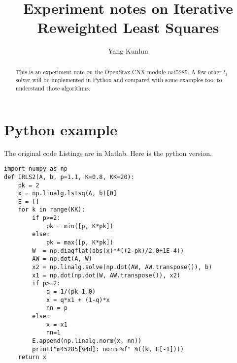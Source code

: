 \documentclass[12pt]{article}
\begin{document}
\title{Experiment notes on Iterative Reweighted Least Squares}
\author{Yang Kunlun}
\maketitle
\begin{abstract}
    This is an experiment note on the OpenStax-CNX module $m45285$.
    A few other $l_1$ solver will be implemented in Python and compared 
    with some examples too, to understand those algorithms.
\end{abstract}

\section{Python example}
The original code Listings are in Matlab. Here is the python version.
\begin{lstlisting}[style=myPy]
import numpy as np
def IRLS2(A, b, p=1.1, K=0.8, KK=20):
    pk = 2
    x = np.linalg.lstsq(A, b)[0]
    E = []
    for k in range(KK):
        if p>=2:
            pk = min([p, K*pk])
        else:
            pk = max([p, K*pk])
        W  = np.diagflat(abs(x)**((2-pk)/2.0+1E-4))
        AW = np.dot(A, W)
        x2 = np.linalg.solve(np.dot(AW, AW.transpose()), b)
        x1 = np.dot(np.dot(W, AW.transpose()), x2)
        if p>=2:
            q = 1/(pk-1.0)
            x = q*x1 + (1-q)*x
            nn = p
        else:
            x = x1
            nn=1
        E.append(np.linalg.norm(x, nn))
        print("m45285[%4d]: norm=%f" %((k, E[-1])))
    return x
\end{lstlisting}
\end{document}
